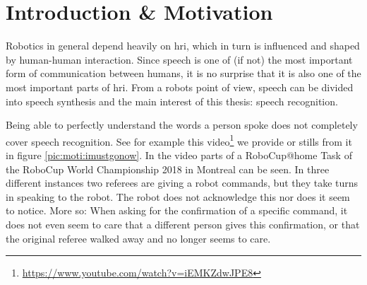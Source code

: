 
\chapter{Introduction \& Motivation}
\label{motiv:start}

Robotics in general depend heavily on \gls{hri}, which in turn is influenced and shaped by human-human interaction. %
Since speech is one of (if not) the most important form of communication between humans, it is no surprise that it is also one of the most important parts of \gls{hri}.
From a robots point of view, speech can be divided into speech synthesis and the main interest of this thesis: speech recognition.

Being able to perfectly understand the words a person spoke does not completely cover speech recognition.
See for example this video\footnote{\url{https://www.youtube.com/watch?v=iEMKZdwJPE8}} we provide or stills from it in figure \ref{pic:moti:imustgonow}.
In the video parts of a RoboCup@home Task of the RoboCup World Championship 2018 in Montreal can be seen.
In three different instances two referees are giving a robot commands, but they take turns in speaking to the robot.
The robot does not acknowledge this nor does it seem to notice.
More so: When asking for the confirmation of a specific command, it does not even seem to care that a different person gives this confirmation, or that the original referee walked away and no longer seems to care.

